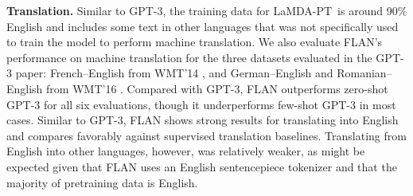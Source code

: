 \textbf{Translation.}
Similar to GPT-3, the training data for LaMDA-PT\ is around 90\% English and includes some text in other languages that was not specifically used to train the model to perform machine translation. We also evaluate FLAN's performance on machine translation for the three datasets evaluated in the GPT-3 paper: French--English from WMT'14 \citep{wmt14}, and German--English and Romanian--English from WMT'16 \citep{wmt16}. Compared with GPT-3, FLAN outperforms zero-shot GPT-3 for all six evaluations, though it underperforms few-shot GPT-3 in most cases. Similar to GPT-3, FLAN shows strong results for translating into English and compares favorably against supervised translation baselines. Translating from English into other languages, however, was relatively weaker, as might be expected given that FLAN uses an English sentencepiece tokenizer and that the majority of pretraining data is English.

\newcommand{\flanvalspaced}[4]{
\makecell[l]{#1\\
{{\color{battleshipgrey}{\tiny std=#2}}}\\
{#3}}}
\newcommand{\flanval}[3]{
\makecell[l]{#1\\
{{\color{battleshipgrey}{\tiny std=#2}}}\\
{#3}}}

\newcommand{\gptvalspaced}[4]{\makecell[l]{#1\\{{\color{battleshipgrey}{\scriptsize #3}}}}}
\newcommand{\gptval}[3]{\makecell[l]{#1\\{{\color{battleshipgrey}{\scriptsize #3}}}}}

